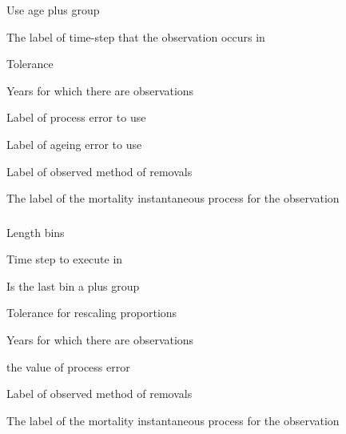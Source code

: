  {Use age plus group}

 {The label of time-step that the observation occurs in}

 {Tolerance}

 {Years for which there are observations}

 {Label of process error to use}

 {Label of ageing error to use}

 {Label of observed method of removals}

 {The label of the mortality instantaneous process for the observation}

\subsubsection[Process Removals By Length]{}

 {Length bins}

 {Time step to execute in}

 {Is the last bin a plus group}

 {Tolerance for rescaling proportions}

 {Years for which there are observations}

 {the value of process error}

 {Label of observed method of removals}

 {The label of the mortality instantaneous process for the observation}

